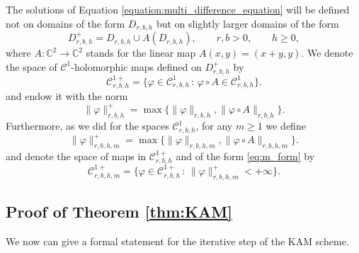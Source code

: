 \documentclass[10pt]{article}
\newcommand{\CC}{\mathbb{C}}
\newcommand{\Domain}[3]{D_{#1, #2, #3}}
\begin{document}
The solutions of Equation \eqref{equation:multi_difference_equation} will be defined not on domains of the form $\Domain{r}{b}{h}$ but on slightly larger domains of the form
\[ \Domain{r}{b}{h}^+= \Domain{r}{b}{h} \cup A(\Domain{r}{b}{h}), \qquad r, b >0, \qquad  h \geq 0,\]
where $A:\CC^2\to\CC^2$ stands for the linear map $A(x,y)=(x+y,y).$ We denote the space of $\mathscr C^1$-holomorphic maps defined on $\Domain{r}{b}{h}^+$ by %
\[{\mathscr C^{1+}_{r,b,h}} = \{\varphi\in \mathscr C^1_{r,b,h}\,:\, \varphi\circ A\in\mathscr C^1_{r,b,h}\}. \] %
and endow it with the norm
\[
\|\varphi\|_{r,b,h}^+ = \max \{\|\varphi\|_{r,b,h},\|\varphi\circ A\|_{r,b,h}\}. \] %
Furthermore, as we did for the spaces $\mathscr C^{1}_{r,b,h}$, for any $m \geq 1$ we define
\[ \|\varphi\|_{r,b,h,m}^+ =  \max \{\|\varphi\|_{r,b,h,m},\|\varphi\circ A\|_{r,b,h,m}\}. \] %
and denote the space of maps in $\mathscr C^{1+}_{r,b,h}$ and of the form \eqref{eq:m_form} by
\[  {\mathscr C^{1+}_{r,b,h,m}} = \{\varphi\in \mathscr C^{1+}_{r,b,h}\,:\,\|\varphi\|_{r,b,h,m}^+ < +\infty\}. \]

\subsection{Proof of Theorem \ref{thm:KAM}}  

We now can give a formal statement for the iterative step of the KAM scheme.
\end{document}

